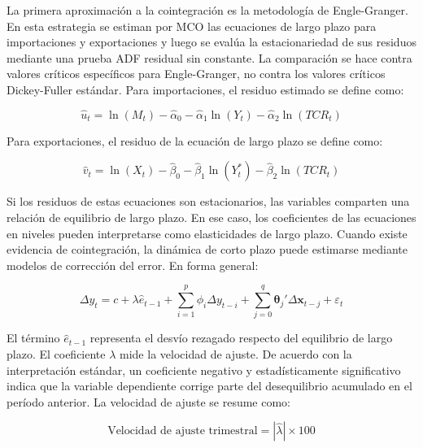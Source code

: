 \documentclass[11pt,a4paper]{article}
\begin{document}
	La primera aproximación a la cointegración es la metodología de Engle-Granger.
	En esta estrategia se estiman por MCO las ecuaciones de largo plazo para
	importaciones y exportaciones y luego se evalúa la estacionariedad de sus
	residuos mediante una prueba ADF residual sin constante. La comparación se hace
	contra valores críticos específicos para Engle-Granger, no contra los valores
	críticos Dickey-Fuller estándar. Para importaciones, el residuo estimado se
	define como:
	
	\begin{equation}
		\widehat{u}_t
		= \ln(M_t) - \widehat{\alpha}_0
		- \widehat{\alpha}_1 \ln(Y_t)
		- \widehat{\alpha}_2 \ln(TCR_t)
		\label{eq:tp3-residuo-eg-importaciones}
	\end{equation}
	
	Para exportaciones, el residuo de la ecuación de largo plazo se define como:
	
	\begin{equation}
		\widehat{v}_t
		= \ln(X_t) - \widehat{\beta}_0
		- \widehat{\beta}_1 \ln(Y_t^*)
		- \widehat{\beta}_2 \ln(TCR_t)
		\label{eq:tp3-residuo-eg-exportaciones}
	\end{equation}
	
	Si los residuos de estas ecuaciones son estacionarios, las variables comparten
	una relación de equilibrio de largo plazo. En ese caso, los coeficientes de las
	ecuaciones en niveles pueden interpretarse como elasticidades de largo plazo.
	Cuando existe evidencia de cointegración, la dinámica de corto plazo puede
	estimarse mediante modelos de corrección del error. En forma general:
	
	\begin{equation}
		\Delta y_t
		= c + \lambda \widehat{e}_{t-1}
		+ \sum_{i=1}^{p}\phi_i \Delta y_{t-i}
		+ \sum_{j=0}^{q}\boldsymbol{\theta}_j'\Delta \mathbf{x}_{t-j}
		+ \varepsilon_t
		\label{eq:tp3-ecm-general}
	\end{equation}
	
	El término \(\widehat{e}_{t-1}\) representa el desvío rezagado respecto del
	equilibrio de largo plazo. El coeficiente \(\lambda\) mide la velocidad de
	ajuste. De acuerdo con la interpretación estándar, un coeficiente negativo y
	estadísticamente significativo indica que la variable dependiente corrige parte
	del desequilibrio acumulado en el período anterior. La velocidad de ajuste se
	resume como:
	
	\begin{equation}
		\text{Velocidad de ajuste trimestral}
		= |\widehat{\lambda}| \times 100
		\label{eq:tp3-velocidad-ajuste}
	\end{equation}
\end{document}
